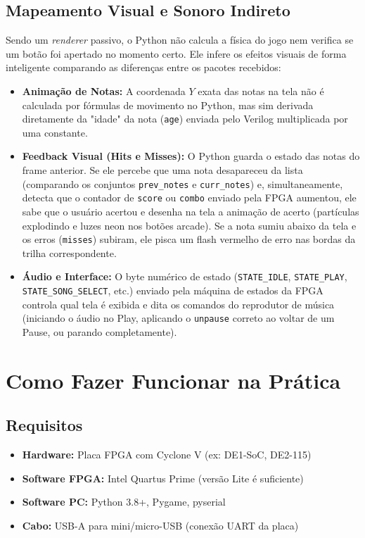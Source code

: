 \documentclass[12pt,a4paper]{article}
\begin{document}
\subsection{Mapeamento Visual e Sonoro Indireto}

Sendo um \emph{renderer} passivo, o Python não calcula a física do jogo nem verifica se um botão foi apertado no momento certo. Ele infere os efeitos visuais de forma inteligente comparando as diferenças entre os pacotes recebidos:
\begin{itemize}
    \item \textbf{Animação de Notas:} A coordenada $Y$ exata das notas na tela não é calculada por fórmulas de movimento no Python, mas sim derivada diretamente da "idade" da nota (\texttt{age}) enviada pelo Verilog multiplicada por uma constante.
    \item \textbf{Feedback Visual (Hits e Misses):} O Python guarda o estado das notas do frame anterior. Se ele percebe que uma nota desapareceu da lista (comparando os conjuntos \texttt{prev\_notes} e \texttt{curr\_notes}) e, simultaneamente, detecta que o contador de \texttt{score} ou \texttt{combo} enviado pela FPGA aumentou, ele sabe que o usuário acertou e desenha na tela a animação de acerto (partículas explodindo e luzes neon nos botões arcade). Se a nota sumiu abaixo da tela e os erros (\texttt{misses}) subiram, ele pisca um flash vermelho de erro nas bordas da trilha correspondente.
    \item \textbf{Áudio e Interface:} O byte numérico de estado (\texttt{STATE\_IDLE}, \texttt{STATE\_PLAY}, \texttt{STATE\_SONG\_SELECT}, etc.) enviado pela máquina de estados da FPGA controla qual tela é exibida e dita os comandos do reprodutor de música (iniciando o áudio no Play, aplicando o \texttt{unpause} correto ao voltar de um Pause, ou parando completamente).
\end{itemize}

\section{Como Fazer Funcionar na Prática}

\subsection{Requisitos}

\begin{itemize}
    \item \textbf{Hardware:} Placa FPGA com Cyclone V (ex: DE1-SoC, DE2-115)
    \item \textbf{Software FPGA:} Intel Quartus Prime (versão Lite é suficiente)
    \item \textbf{Software PC:} Python 3.8+, Pygame, pyserial
    \item \textbf{Cabo:} USB-A para mini/micro-USB (conexão UART da placa)
\end{itemize}
\end{document}
